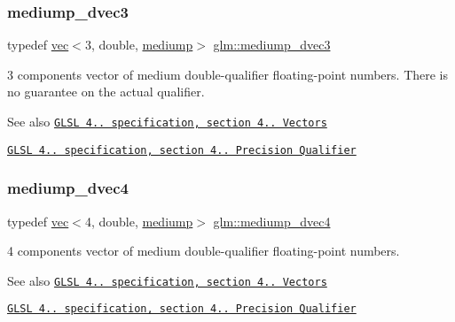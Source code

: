 \subsubsection{\texorpdfstring{mediump\+\_\+dvec3}{mediump\_dvec3}}
{\footnotesize\ttfamily typedef \hyperlink{structglm_1_1vec}{vec}$<$3, double, \hyperlink{namespaceglm_a36ed105b07c7746804d7fdc7cc90ff25a6416f3ea0c9025fb21ed50c4d6620482}{mediump}$>$ \hyperlink{group__core__precision_ga11d5fecb18f3d7e5f7add0663a8d7d3f}{glm\+::mediump\+\_\+dvec3}}

3 components vector of medium double-\/qualifier floating-\/point numbers. There is no guarantee on the actual qualifier.

\begin{DoxySeeAlso}{See also}
\href{http://www.opengl.org/registry/doc/GLSLangSpec.4.20.8.pdf}{\tt G\+L\+SL 4.. specification, section 4.. Vectors} 

\href{http://www.opengl.org/registry/doc/GLSLangSpec.4.20.8.pdf}{\tt G\+L\+SL 4.. specification, section 4.. Precision Qualifier} 
\end{DoxySeeAlso}
\mbox{\label{group__core__precision_ga860fd4068c3e89885f814e3b8f312f2f}} 
\subsubsection{\texorpdfstring{mediump\+\_\+dvec4}{mediump\_dvec4}}
{\footnotesize\ttfamily typedef \hyperlink{structglm_1_1vec}{vec}$<$4, double, \hyperlink{namespaceglm_a36ed105b07c7746804d7fdc7cc90ff25a6416f3ea0c9025fb21ed50c4d6620482}{mediump}$>$ \hyperlink{group__core__precision_ga860fd4068c3e89885f814e3b8f312f2f}{glm\+::mediump\+\_\+dvec4}}

4 components vector of medium double-\/qualifier floating-\/point numbers.

\begin{DoxySeeAlso}{See also}
\href{http://www.opengl.org/registry/doc/GLSLangSpec.4.20.8.pdf}{\tt G\+L\+SL 4.. specification, section 4.. Vectors} 

\href{http://www.opengl.org/registry/doc/GLSLangSpec.4.20.8.pdf}{\tt G\+L\+SL 4.. specification, section 4.. Precision Qualifier} 
\end{DoxySeeAlso}
\mbox{\label{group__core__precision_gac785826c039fe6c97c03b37c81c1a68e}} 
